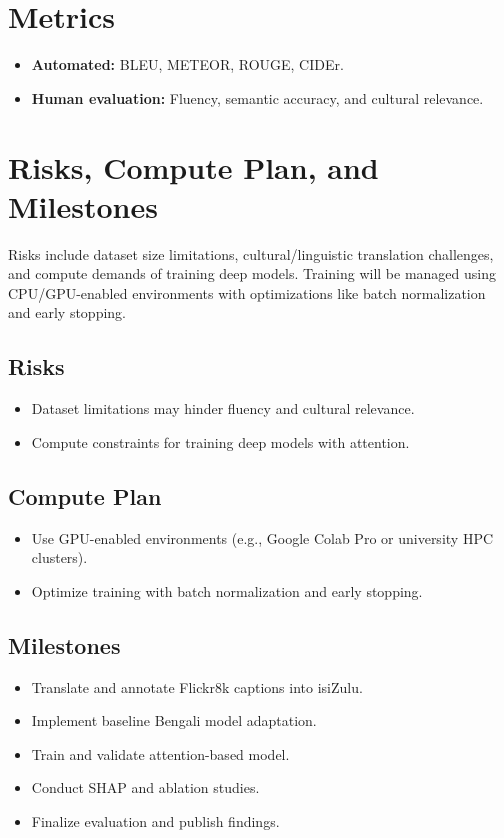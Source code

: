 \documentclass[12pt]{article}
\begin{document}
\section{Metrics}
\begin{itemize}[leftmargin=*,noitemsep]
    \item \textbf{Automated:} BLEU, METEOR, ROUGE, CIDEr.
    \item \textbf{Human evaluation:} Fluency, semantic accuracy, and cultural relevance.
\end{itemize}

\section{Risks, Compute Plan, and Milestones}
Risks include dataset size limitations, cultural/linguistic translation challenges, and compute demands of training deep models. Training will be managed using CPU/GPU-enabled environments with optimizations like batch normalization and early stopping. 

\subsection{Risks}
\begin{itemize}
    \item Dataset limitations may hinder fluency and cultural relevance.
    \item Compute constraints for training deep models with attention.
\end{itemize}

\subsection{Compute Plan}
\begin{itemize}
    \item Use GPU-enabled environments (e.g., Google Colab Pro or university HPC clusters).
    \item Optimize training with batch normalization and early stopping.
\end{itemize}

\subsection{Milestones}
\begin{itemize}
    \item Translate and annotate Flickr8k captions into isiZulu.
    \item Implement baseline Bengali model adaptation.
    \item Train and validate attention-based model.
    \item Conduct SHAP and ablation studies.
    \item Finalize evaluation and publish findings.
\end{itemize}
\end{document}
